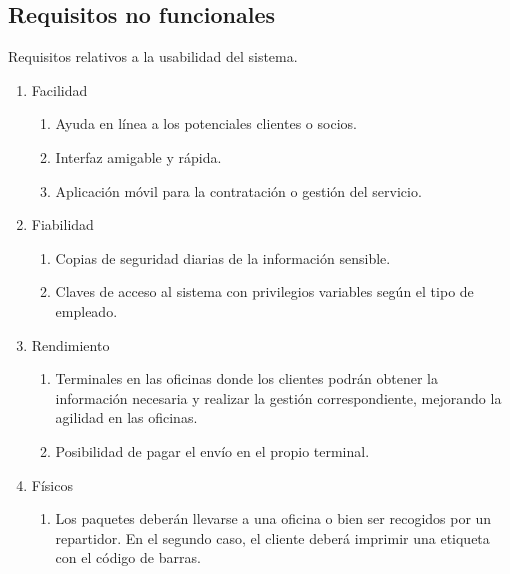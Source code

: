 \documentclass[12pt,spanish]{article}
\begin{document}
\subsection{Requisitos no funcionales}
Requisitos relativos a la usabilidad del sistema.
\begin{enumerate}[label=\textbf{RNF-\arabic*}]
	\item Facilidad
		\begin{enumerate}[label=\textbf{RNF-1.\arabic*}]
			\item Ayuda en línea a los potenciales clientes o socios.
			\item Interfaz amigable y rápida.
			\item Aplicación móvil para la contratación o gestión del servicio.
		\end{enumerate}
	\item Fiabilidad
		\begin{enumerate}[label=\textbf{RNF-2.\arabic*}]
			\item Copias de seguridad diarias de la información sensible.
			\item Claves de acceso al sistema con privilegios variables según el tipo de 						empleado.
		\end{enumerate}
	\item Rendimiento
		\begin{enumerate}[label=\textbf{RNF-3.\arabic*}]
			\item Terminales en las oficinas donde los clientes podrán obtener la información 					necesaria y realizar la gestión correspondiente, mejorando la agilidad en las 						oficinas.
			\item Posibilidad de pagar el envío en el propio terminal.
		\end{enumerate}
	\item Físicos
		\begin{enumerate}[label=\textbf{RNF-4.\arabic*}]
			\item Los paquetes deberán llevarse a una oficina o bien ser recogidos por un 						repartidor. En el segundo caso, el cliente deberá imprimir una etiqueta con el código 			de barras.
		\end{enumerate}
		
\end{enumerate}
\end{document}
